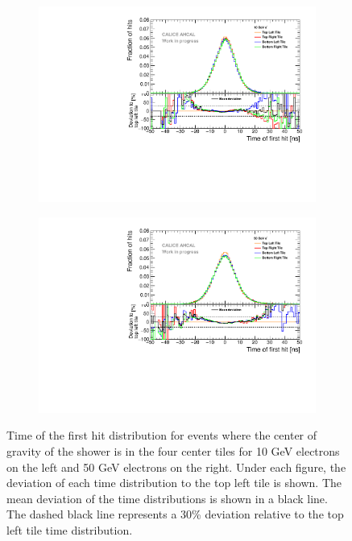 \begin{figure}[htbp!]
	\begin{subfigure}[t]{0.5\textwidth}
		\centering
		\includegraphics[width=1\textwidth]{../Thesis_Plots/Timing/Electrons/Plots/Systematic_Inhomogeneity_10GeV.pdf}
		\caption{}\label{fig:timing_syst_10GeV}
	\end{subfigure}
	\hfill
	\begin{subfigure}[t]{0.5\textwidth}
		\centering
		\includegraphics[width=1\textwidth]{../Thesis_Plots/Timing/Electrons/Plots/Systematic_Inhomogeneity_50GeV.pdf}
		\caption{}\label{fig:timing_syst_50GeV}
	\end{subfigure}
	\caption{Time of the first hit distribution for events where the center of gravity of the shower is in the four center tiles for 10 GeV electrons on the left and 50 GeV electrons on the right. Under each figure, the deviation of each time distribution to the top left tile is shown. The mean deviation of the time distributions is shown in a black line. The dashed black line represents a 30\% deviation relative to the top left tile time distribution.} \label{fig:SystTimeElectrons}
\end{figure}

